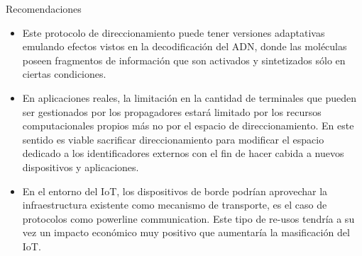 \begin{frame}{Recomendaciones}
  \begin{block}{}
   \begin{itemize}
   \justifying
    \item<1->  Este protocolo de direccionamiento puede tener versiones adaptativas emulando efectos vistos en la decodificación del ADN, donde las moléculas poseen fragmentos de información que son activados y sintetizados sólo en ciertas condiciones.
    \item<1->  En aplicaciones reales, la limitación en la cantidad de terminales que pueden ser gestionados por los propagadores estará limitado por los recursos computacionales propios más no por el espacio de direccionamiento. En este sentido es viable sacrificar direccionamiento para modificar el espacio dedicado a los identificadores externos con el fin de hacer cabida a nuevos dispositivos y aplicaciones.
    \item<1-> En el entorno del IoT, los dispositivos de borde podrían aprovechar la infraestructura existente como mecanismo de transporte, es el caso de protocolos como powerline communication. Este tipo de re-usos tendría a su vez un impacto económico muy positivo que aumentaría la masificación del IoT.  
    \end{itemize}
  \end{block}
\end{frame}